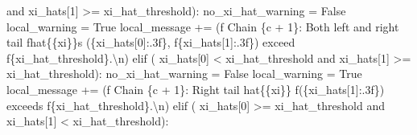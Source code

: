 \documentclass[
  letterpaper,
  DIV=11,
  numbers=noendperiod]{scrartcl}
\newenvironment{Shaded}{\begin{snugshade}}{\end{snugshade}}
\newcommand{\CharTok}[1]{\textcolor[rgb]{0.13,0.47,0.30}{#1}}
\newcommand{\ControlFlowTok}[1]{\textcolor[rgb]{0.00,0.23,0.31}{#1}}
\newcommand{\DecValTok}[1]{\textcolor[rgb]{0.68,0.00,0.00}{#1}}
\newcommand{\KeywordTok}[1]{\textcolor[rgb]{0.00,0.23,0.31}{#1}}
\newcommand{\NormalTok}[1]{\textcolor[rgb]{0.00,0.23,0.31}{#1}}
\newcommand{\OperatorTok}[1]{\textcolor[rgb]{0.37,0.37,0.37}{#1}}
\newcommand{\SpecialCharTok}[1]{\textcolor[rgb]{0.37,0.37,0.37}{#1}}
\newcommand{\SpecialStringTok}[1]{\textcolor[rgb]{0.13,0.47,0.30}{#1}}
\newcommand{\VariableTok}[1]{\textcolor[rgb]{0.07,0.07,0.07}{#1}}
\begin{document}
\begin{Shaded}
\begin{Highlighting}[]
          \KeywordTok{and}\NormalTok{ xi\_hats[}\DecValTok{1}\NormalTok{] }\OperatorTok{\textgreater{}=}\NormalTok{ xi\_hat\_threshold):}
\NormalTok{        no\_xi\_hat\_warning }\OperatorTok{=} \VariableTok{False}
\NormalTok{        local\_warning }\OperatorTok{=} \VariableTok{True}
\NormalTok{        local\_message }\OperatorTok{+=}\NormalTok{ (}\SpecialStringTok{f\textquotesingle{}  Chain }\SpecialCharTok{\{}\NormalTok{c }\OperatorTok{+} \DecValTok{1}\SpecialCharTok{\}}\SpecialStringTok{: Both left and right tail \textquotesingle{}}
                          \SpecialStringTok{f\textquotesingle{}hat}\CharTok{\{\{}\SpecialStringTok{xi}\CharTok{\}\}}\SpecialStringTok{s (}\SpecialCharTok{\{}\NormalTok{xi\_hats[}\DecValTok{0}\NormalTok{]}\SpecialCharTok{:.3f\}}\SpecialStringTok{, \textquotesingle{}}
                          \SpecialStringTok{f\textquotesingle{}}\SpecialCharTok{\{}\NormalTok{xi\_hats[}\DecValTok{1}\NormalTok{]}\SpecialCharTok{:.3f\}}\SpecialStringTok{) exceed \textquotesingle{}}
                          \SpecialStringTok{f\textquotesingle{}}\SpecialCharTok{\{}\NormalTok{xi\_hat\_threshold}\SpecialCharTok{\}}\SpecialStringTok{.}\CharTok{\textbackslash{}n}\SpecialStringTok{\textquotesingle{}}\NormalTok{)}
      \ControlFlowTok{elif}\NormalTok{ (    xi\_hats[}\DecValTok{0}\NormalTok{] }\OperatorTok{\textless{}}\NormalTok{ xi\_hat\_threshold}
            \KeywordTok{and}\NormalTok{ xi\_hats[}\DecValTok{1}\NormalTok{] }\OperatorTok{\textgreater{}=}\NormalTok{ xi\_hat\_threshold):}
\NormalTok{        no\_xi\_hat\_warning }\OperatorTok{=} \VariableTok{False}
\NormalTok{        local\_warning }\OperatorTok{=} \VariableTok{True}
\NormalTok{        local\_message }\OperatorTok{+=}\NormalTok{ (}\SpecialStringTok{f\textquotesingle{}  Chain }\SpecialCharTok{\{}\NormalTok{c }\OperatorTok{+} \DecValTok{1}\SpecialCharTok{\}}\SpecialStringTok{: Right tail hat}\CharTok{\{\{}\SpecialStringTok{xi}\CharTok{\}\}}\SpecialStringTok{ \textquotesingle{}}
                          \SpecialStringTok{f\textquotesingle{}(}\SpecialCharTok{\{}\NormalTok{xi\_hats[}\DecValTok{1}\NormalTok{]}\SpecialCharTok{:.3f\}}\SpecialStringTok{) exceeds \textquotesingle{}}
                          \SpecialStringTok{f\textquotesingle{}}\SpecialCharTok{\{}\NormalTok{xi\_hat\_threshold}\SpecialCharTok{\}}\SpecialStringTok{.}\CharTok{\textbackslash{}n}\SpecialStringTok{\textquotesingle{}}\NormalTok{)}
      \ControlFlowTok{elif}\NormalTok{ (    xi\_hats[}\DecValTok{0}\NormalTok{] }\OperatorTok{\textgreater{}=}\NormalTok{ xi\_hat\_threshold}
            \KeywordTok{and}\NormalTok{ xi\_hats[}\DecValTok{1}\NormalTok{] }\OperatorTok{\textless{}}\NormalTok{ xi\_hat\_threshold):}

\end{Highlighting}
\end{Shaded}
\end{document}
